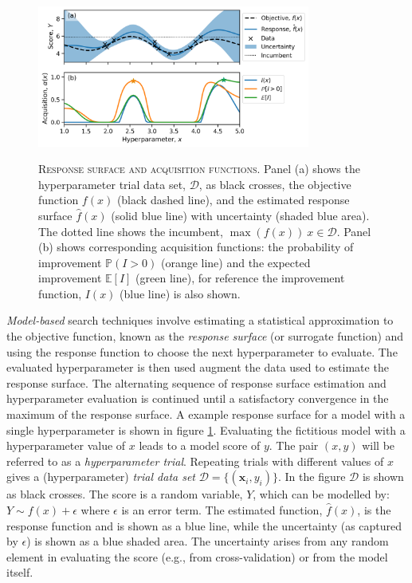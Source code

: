 \begin{figure}
    \centering
    \caption[Response surface and acquisition functions]{\textsc{Response surface and acquisition functions}. Panel (a) shows the hyperparameter trial data set, $\mathcal{D}$, as black crosses, the objective function $f(x)$ (black dashed line), and the estimated response surface $\hat{f}(x)$ (solid blue line) with uncertainty (shaded blue area). The dotted line shows the incumbent, $\max(f(x))\ x\in \mathcal{D}$. Panel (b) shows corresponding acquisition functions: the probability of improvement $\mathbb{P}(I>0)$ (orange line) and the expected improvement $\mathbb{E}[I]$ (green line), for reference the improvement function, $I(x)$ (blue line) is also shown. }
    \includegraphics[width=0.8\textwidth]{chapters/msm_optimization/figures/response_surface_explainer.png}
    \label{fig:msm_rsm_explainer}
\end{figure}

\emph{Model-based} search techniques involve estimating a statistical approximation to the objective function, known  as the \emph{response surface} (or surrogate function) and using the response function to choose the next hyperparameter to evaluate\cite{hutterSequentialModelbasedOptimization2011}. The evaluated hyperparameter is then used augment the data used to estimate the response surface\cite{hutterSequentialModelbasedOptimization2011}. The alternating sequence of response surface estimation and hyperparameter evaluation is continued until a satisfactory convergence in the maximum of the response surface\cite{hutterSequentialModelbasedOptimization2011}. A example response surface for a model with a single hyperparameter is shown in figure \ref{fig:msm_rsm_explainer}. Evaluating the fictitious model with a hyperparameter value of $x$ leads to a model score of $y$. The pair $(x, y)$ will be referred to as a \emph{hyperparameter trial}. Repeating trials with different values of $x$ gives a (hyperparameter) \emph{trial data set}  $\mathcal{D}=\{(\mathbf{x}_{i}, y_{i})\}$. In the figure $\mathcal{D}$ is shown as black crosses. The score is a random variable, $Y$, which can be modelled by: $Y \sim f(x) + \epsilon$ where $\epsilon$ is an error term. The estimated function, $\hat{f}(x)$, is the response function and is shown as a blue line, while the uncertainty (as captured by $\epsilon$) is shown as a blue shaded area. The uncertainty arises from any random element in evaluating the score (e.g., from cross-validation) or from the model itself.  

